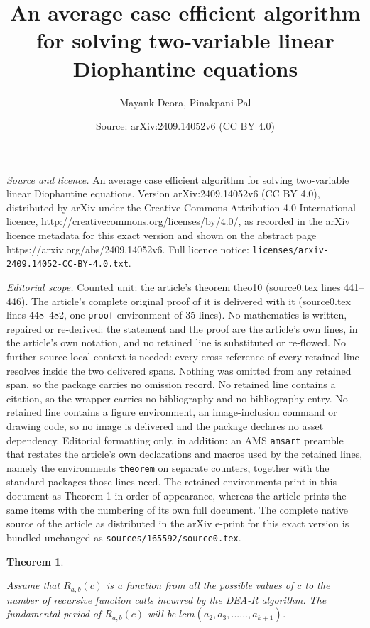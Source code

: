 \documentclass[10pt,a4paper]{amsart}
\title{An average case efficient algorithm for solving two-variable linear Diophantine equations}
\author{Mayank Deora, Pinakpani Pal}
\date{Source: arXiv:2409.14052v6 (CC BY 4.0)}
\newtheorem{theorem}{Theorem}
\begin{document}
\maketitle

\noindent\emph{Source and licence.} An average case efficient algorithm for solving two-variable linear Diophantine equations. Version arXiv:2409.14052v6 (CC BY 4.0), distributed by arXiv under the Creative Commons Attribution 4.0 International licence, http://creativecommons.org/licenses/by/4.0/, as recorded in the arXiv licence metadata for this exact version and shown on the abstract page https://arxiv.org/abs/2409.14052v6. Full licence notice: \texttt{licenses/arxiv-2409.14052-CC-BY-4.0.txt}.\par\smallskip

\noindent\textit{Editorial scope.} Counted unit: the article's theorem theo10 (source0.tex lines 441--446). The article's complete original proof of it is delivered with it (source0.tex lines 448--482, one \texttt{proof} environment of 35 lines). No mathematics is written, repaired or re-derived: the statement and the proof are the article's own lines, in the article's own notation, and no retained line is substituted or re-flowed.  No further source-local context is needed: every cross-reference of every retained line resolves inside the two delivered spans.  Nothing was omitted from any retained span, so the package carries no omission record.  No retained line contains a citation, so the wrapper carries no bibliography and no bibliography entry.  No retained line contains a figure environment, an image-inclusion command or drawing code, so no image is delivered and the package declares no asset dependency.  Editorial formatting only, in addition: an AMS \texttt{amsart} preamble that restates the article's own declarations and macros used by the retained lines, namely the environments \texttt{theorem} on separate counters, together with the standard packages those lines need.  The retained environments print in this document as Theorem 1 in order of appearance, whereas the article prints the same items with the numbering of its own full document.  The complete native source of the article as distributed in the arXiv e-print for this exact version is bundled unchanged as \texttt{sources/165592/source0.tex}.
\begin{theorem} \label{theo10}

 Assume that $R_{a,b}(c)$ is a function from all the possible values of $c$ to the number of recursive function calls incurred by the DEA-R algorithm. The fundamental period of $R_{a,b}(c)$ will be $lcm(a_2,a_3,......,a_{k+1})$.
 
    
\end{theorem}
\end{document}
